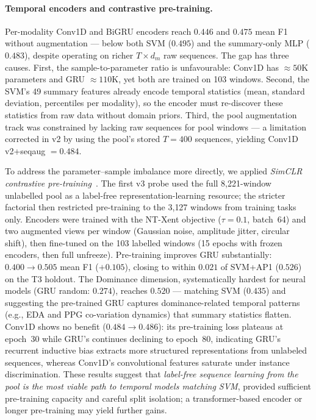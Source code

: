 \documentclass[sigconf,review,anonymous]{acmart}
\begin{document}
\paragraph{Temporal encoders and contrastive pre-training.}
Per-modality Conv1D and BiGRU encoders reach $0.446$ and $0.475$ mean F1
without augmentation --- below both SVM ($0.495$) and the summary-only MLP
($0.483$), despite operating on richer $T{\times}d_m$ raw sequences.
The gap has three causes.
First, the sample-to-parameter ratio is unfavourable: Conv1D has ${\approx}50$K
parameters and GRU ${\approx}110$K, yet both are trained on 103 windows.
Second, the SVM's 49 summary features already encode temporal statistics
(mean, standard deviation, percentiles per modality), so the encoder must
re-discover these statistics from raw data without domain priors.
Third, the pool augmentation track was constrained by lacking raw sequences for
pool windows --- a limitation corrected in v2 by using the pool's stored
$T{=}400$ sequences, yielding Conv1D v2+seqaug $= 0.484$.

To address the parameter--sample imbalance more directly, we applied
\emph{SimCLR contrastive pre-training}~\cite{chen2020simclr}.
The first v3 probe used the full 8{,}221-window unlabelled pool as a
label-free representation-learning resource; the stricter factorial then
restricted pre-training to the 3{,}127 windows from training tasks only.
Encoders were trained with the NT-Xent objective ($\tau{=}0.1$, batch~64) and
two augmented views per window (Gaussian noise, amplitude jitter, circular
shift), then fine-tuned on the 103 labelled windows (15 epochs with frozen
encoders, then full unfreeze).
Pre-training improves GRU substantially: $0.400 \to 0.505$ mean F1 ($+0.105$),
closing to within $0.021$ of SVM+AP1 ($0.526$) on the T3 holdout.
The Dominance dimension, systematically hardest for neural models
(GRU random: $0.274$), reaches $0.520$ --- matching SVM ($0.435$) and
suggesting the pre-trained GRU captures dominance-related temporal patterns
(e.g., EDA and PPG co-variation dynamics) that summary statistics flatten.
Conv1D shows no benefit ($0.484 \to 0.486$): its pre-training loss plateaus
at epoch~30 while GRU's continues declining to epoch~80, indicating GRU's
recurrent inductive bias extracts more structured representations from unlabeled
sequences, whereas Conv1D's convolutional features saturate under instance
discrimination.
These results suggest that \emph{label-free sequence learning from the pool
is the most viable path to temporal models matching SVM}, provided sufficient
pre-training capacity and careful split isolation; a transformer-based encoder
or longer pre-training may yield further gains.
\end{document}
